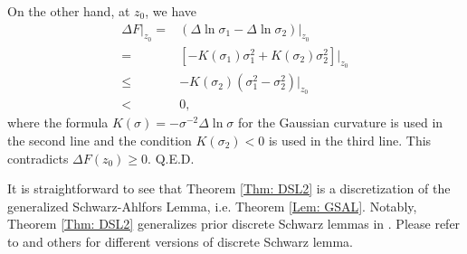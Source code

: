 \documentclass[12pt]{amsart}
\theoremstyle{definition}
\def\qed{\hfill{Q.E.D.}\smallskip}
\begin{document}
On the other hand, at $z_0$, we have
\begin{align*}
\Delta F|_{z_0}
=&(\Delta\ln\sigma_1-\Delta\ln\sigma_2)|_{z_0}\\
=&[-K(\sigma_1)\sigma^2_1+K(\sigma_2)\sigma^2_2]|_{z_0}\\
\leq& -K(\sigma_2)(\sigma^2_1-\sigma^2_2)|_{z_0}\\
<&0,
\end{align*}
where the formula $K(\sigma)=-\sigma^{-2}\Delta \ln \sigma$ for the Gaussian curvature is used in the second line and the condition $K(\sigma_2)<0$ is used in the third line.
This contradicts $\Delta F(z_0)\geq0$.
\qed

It is straightforward to see that Theorem \ref{Thm: DSL2} is a discretization of the generalized Schwarz-Ahlfors Lemma, i.e. Theorem \ref{Lem: GSAL}.
Notably, Theorem \ref{Thm: DSL2} generalizes prior discrete Schwarz lemmas in \cite{He, BS2, BS3,Van1994}. 
Please refer to \cite{Rodin1, Rodin2, HS1993, HS1996} and others for different versions of discrete Schwarz lemma.



\end{document}
